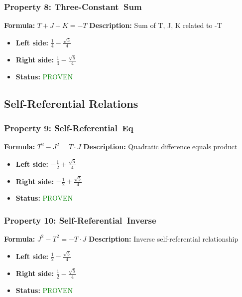 \subsubsection*{Property 8: Three-Constant~Sum}
\textbf{Formula:} $T + J + K = -T$
\textbf{Description:} Sum of T, J, K related to -T

\begin{itemize}
\item \textbf{Left side:} $\frac{1}{4} - \frac{\sqrt{5}}{4}$
\item \textbf{Right side:} $\frac{1}{4} - \frac{\sqrt{5}}{4}$
\item \textbf{Status:} \textcolor{green}{PROVEN}
\end{itemize}


\subsection{Self-Referential Relations}

\subsubsection*{Property 9: Self-Referential~Eq}
\textbf{Formula:} $T^2 - J^2 = T \cdot J$
\textbf{Description:} Quadratic difference equals product

\begin{itemize}
\item \textbf{Left side:} $- \frac{1}{2} + \frac{\sqrt{5}}{4}$
\item \textbf{Right side:} $- \frac{1}{2} + \frac{\sqrt{5}}{4}$
\item \textbf{Status:} \textcolor{green}{PROVEN}
\end{itemize}

\subsubsection*{Property 10: Self-Referential~Inverse}
\textbf{Formula:} $J^2 - T^2 = -T \cdot J$
\textbf{Description:} Inverse self-referential relationship

\begin{itemize}
\item \textbf{Left side:} $\frac{1}{2} - \frac{\sqrt{5}}{4}$
\item \textbf{Right side:} $\frac{1}{2} - \frac{\sqrt{5}}{4}$
\item \textbf{Status:} \textcolor{green}{PROVEN}
\end{itemize}

